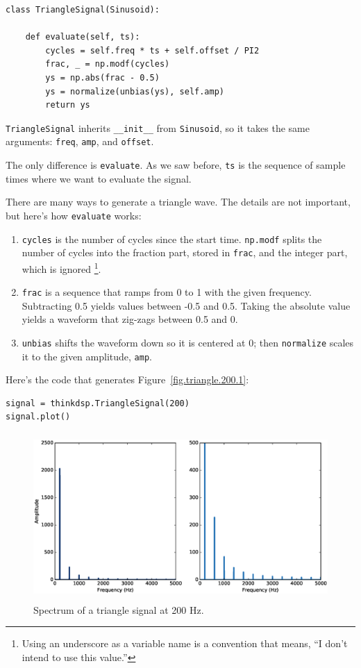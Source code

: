 \documentclass[12pt]{book}
\begin{document}
\begin{verbatim}
class TriangleSignal(Sinusoid):
    
    def evaluate(self, ts):
        cycles = self.freq * ts + self.offset / PI2
        frac, _ = np.modf(cycles)
        ys = np.abs(frac - 0.5)
        ys = normalize(unbias(ys), self.amp)
        return ys
\end{verbatim}

{\tt TriangleSignal} inherits \verb"__init__" from {\tt Sinusoid},
so it takes the same arguments: {\tt freq}, {\tt amp}, and {\tt offset}.

The only difference is {\tt evaluate}.  As we saw before,
{\tt ts} is the sequence of sample times where we want to
evaluate the signal.

There are many ways to generate a triangle wave.  The details
are not important, but here's how {\tt evaluate} works:

\begin{enumerate}

\item {\tt cycles} is the number of cycles since the start time.
{\tt np.modf} splits the number of cycles into the fraction
part, stored in {\tt frac}, and the integer part, which is ignored
\footnote{Using an underscore as a variable name is a convention that
means, ``I don't intend to use this value.''}.

\item {\tt frac} is a sequence that ramps from 0 to 1 with the given
  frequency.  Subtracting 0.5 yields values between -0.5 and 0.5.
  Taking the absolute value yields a waveform that zig-zags between
  0.5 and 0.

\item {\tt unbias} shifts the waveform down so it is centered at 0; then
{\tt normalize} scales it to the given amplitude, {\tt amp}.

\end{enumerate}

Here's the code that generates Figure~\ref{fig.triangle.200.1}:

\begin{verbatim}
signal = thinkdsp.TriangleSignal(200)
signal.plot()
\end{verbatim}

\begin{figure}
\centerline{\includegraphics[height=2.5in]{figs/triangle-200-2.eps}}
\caption{Spectrum of a triangle signal at 200 Hz.}
\label{fig.triangle.200.2}
\end{figure}
\end{document}
